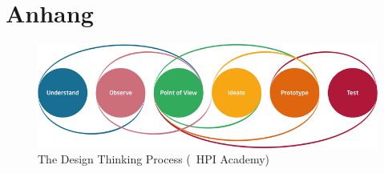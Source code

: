\appendix %

    \renewcommand{\thetable}{\Alph{table}}
    \setcounter{table}{0}
    \renewcommand{\thefigure}{\Alph{figure}}
    \setcounter{figure}{0}

\section{Anhang}

\begin{figure}[h]
    \includegraphics[width=\textwidth]{img/DT_process.png}
    \caption{The Design Thinking Process (\textcopyright ~HPI Academy)}
    \label{fig:dt_process}
\end{figure} 

